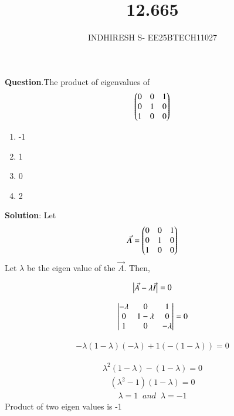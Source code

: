 \documentclass[journal]{IEEEtran}
\theoremstyle{remark}
\begin{document}

\onecolumn

\title{12.665}
\author{INDHIRESH S- EE25BTECH11027}
\maketitle


\renewcommand{\thefigure}{\theenumi}
\renewcommand{\thetable}{\theenumi}

\textbf{Question}.The product of eigenvalues of
  \begin{align*}
      \begin{pmatrix}0&0&1\\0&1&0\\1&0&0\end{pmatrix}
  \end{align*}
\begin{enumerate}
    \item -1
    \item 1
    \item  0
    \item 2
\end{enumerate}
\textbf{Solution}:
Let
\begin{align}
 \Vec{A}=\begin{pmatrix}0&0&1\\0&1&0\\1&0&0\end{pmatrix}
\end{align}
Let $\lambda$ be the eigen value of the $\Vec{A}$. Then,

\begin{align}
  \begin{vmatrix}\Vec{A}-\lambda\Vec{I}\end{vmatrix}=0
\end{align}

\begin{align}
  \begin{vmatrix}-\lambda&0&1\\0&1-\lambda&0\\1&0&-\lambda\end{vmatrix}=0
\end{align}

\begin{align}
  -\lambda(1-\lambda)(-\lambda)+1(-(1-\lambda))=0
\end{align}

\begin{align}
\lambda^2(1-\lambda)-(1-\lambda)=0
\end{align}
\begin{align}
    (\lambda^2-1)(1-\lambda)=0
\end{align}
\begin{align}
    \lambda=1\;\;and\;\;\lambda=-1
\end{align}
Product of two eigen values is -1
\end{document}
